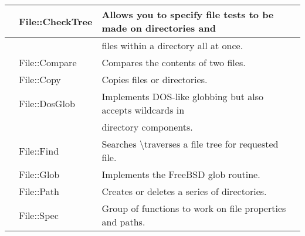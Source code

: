 \documentclass[a4paper,11pt]{book}
\begin{document}
\begin{tabular}{|p{0.2in}|p{1.3in}|p{2.6in}|}
 & File::CheckTree & Allows you to specify file tests to be made on directories and \\ \hline 
 &  & files within a directory all at once. \\ \hline 
 & File::Compare & Compares the contents of two files. \\ \hline 
 & File::Copy & Copies files or directories. \\ \hline 
 & File::DosGlob & Implements DOS-like globbing but also accepts wildcards in \\ \hline 
 &  & directory components. \\ \hline 
 & File::Find & Searches \textbackslash  traverses a file tree for requested file. \\ \hline 
 & File::Glob & Implements the FreeBSD glob routine. \\ \hline 
 & File::Path & Creates or deletes a series of directories. \\ \hline 
 & File::Spec & Group of functions to work on file properties and paths. \\ \hline 
\end{tabular}



\noindent 
\end{document}
